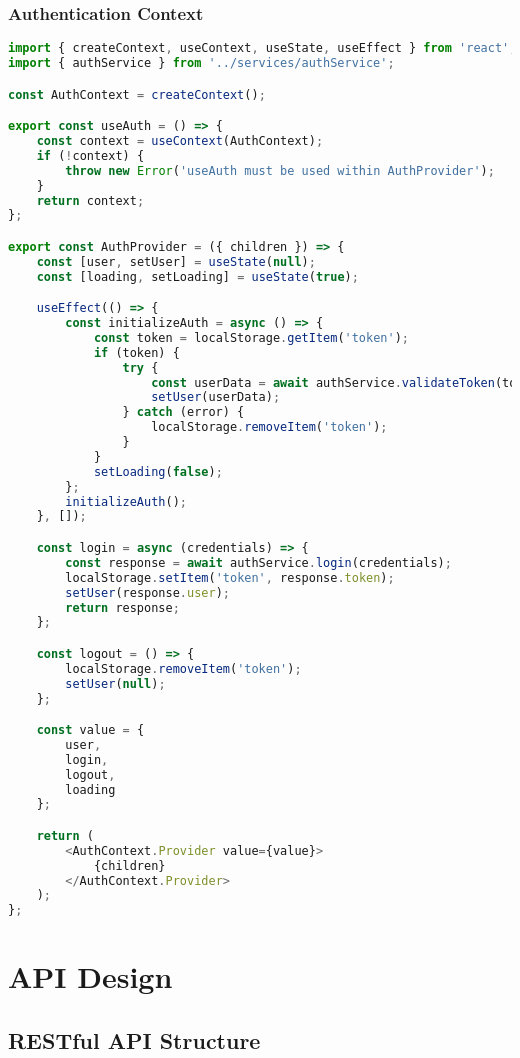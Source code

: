 \documentclass[12pt,a4paper]{article}
\begin{document}
\subsubsection{Authentication Context}
\begin{lstlisting}[language=JavaScript, caption=Authentication Context]
import { createContext, useContext, useState, useEffect } from 'react';
import { authService } from '../services/authService';

const AuthContext = createContext();

export const useAuth = () => {
    const context = useContext(AuthContext);
    if (!context) {
        throw new Error('useAuth must be used within AuthProvider');
    }
    return context;
};

export const AuthProvider = ({ children }) => {
    const [user, setUser] = useState(null);
    const [loading, setLoading] = useState(true);

    useEffect(() => {
        const initializeAuth = async () => {
            const token = localStorage.getItem('token');
            if (token) {
                try {
                    const userData = await authService.validateToken(token);
                    setUser(userData);
                } catch (error) {
                    localStorage.removeItem('token');
                }
            }
            setLoading(false);
        };
        initializeAuth();
    }, []);

    const login = async (credentials) => {
        const response = await authService.login(credentials);
        localStorage.setItem('token', response.token);
        setUser(response.user);
        return response;
    };

    const logout = () => {
        localStorage.removeItem('token');
        setUser(null);
    };

    const value = {
        user,
        login,
        logout,
        loading
    };

    return (
        <AuthContext.Provider value={value}>
            {children}
        </AuthContext.Provider>
    );
};
\end{lstlisting}

\section{API Design}

\subsection{RESTful API Structure}
\end{document}
